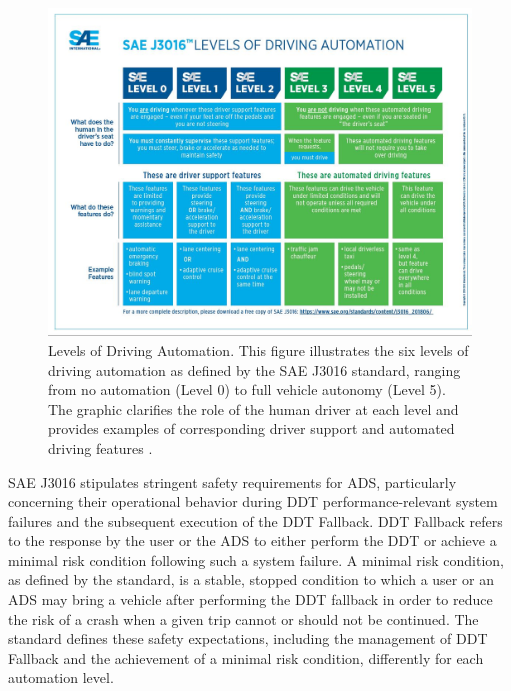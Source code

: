 \begin{figure}
    \centering
    \includegraphics[width=\textwidth]{figures/figure_background_j3016_levels_of_driving_automation.jpg}
    \caption{Levels of Driving Automation. This figure illustrates the six levels of driving automation as defined by the SAE J3016 standard, ranging from no automation (Level 0) to full vehicle autonomy (Level 5). The graphic clarifies the role of the human driver at each level and provides examples of corresponding driver support and automated driving features \cite{sae:j3016:2021apr}.}
    \label{fig:figure_background_j3016_levels_of_driving_automation}
\end{figure}

SAE J3016 \cite{sae:j3016:2021apr} stipulates stringent safety requirements for ADS, particularly concerning their operational behavior during DDT performance-relevant system failures and the subsequent execution of the DDT Fallback. DDT Fallback refers to the response by the user or the ADS to either perform the DDT or achieve a minimal risk condition following such a system failure. A minimal risk condition, as defined by the standard, is a stable, stopped condition to which a user or an ADS may bring a vehicle after performing the DDT fallback in order to reduce the risk of a crash when a given trip cannot or should not be continued. The standard defines these safety expectations, including the management of DDT Fallback and the achievement of a minimal risk condition, differently for each automation level.


